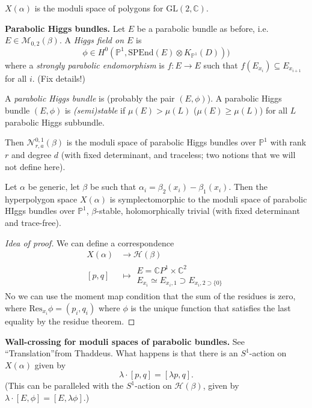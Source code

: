 \begin{theorem}[Boalch]
\label{theorem-Boalch}
$X(\alpha)$ is the moduli space of polygons
for $\text{GL}(2,\mathbb{C})$.
\end{theorem}

\medskip\noindent
{\bf Parabolic Higgs bundles.}
Let $E$ be a parabolic bundle as before, i.e.
$E \in \mathcal{M}_{0,2}(\beta)$.
A {\it Higgs field on $E$} is
$$
\phi \in H^{0}(\mathbb{P}^1,\text{SPEnd}(E)
\otimes K_{\mathbb{P}^1}(D)))
$$
where a {\it strongly parabolic endomorphism}
is  $f:E \to E$
such that $f(E_{x_i})\subseteq E_{x_{i+1}}$
for all $i$.
(Fix details!)

A {\it parabolic Higgs bundle} is (probably
the pair $(E,\phi)$).
A parabolic Higgs bundle $(E,\phi)$ is {\it
(semi)stable}
if  $\mu(E) > \mu(L)$ ($\mu(E) \geq \mu(L)$)
for all
$L$ parabolic Higgs subbundle.

Then $\mathcal{N}_{r,a}^{0,1}(\beta)$ is the
moduli
space of parabolic Higgs bundles over
$\mathbb{P}^1$
with rank $r$ and degree $d$ (with fixed
determinant,
and traceless; two notions that we will not
define here).


\begin{theorem}
\label{theorem-GBSFG}
Let $\alpha$ be generic, let $\beta$
be such that
$\alpha_i=\beta_2(x_i)-\beta_1(x_i)$.
Then the hyperpolygon space $X(\alpha)$
is symplectomorphic to the moduli space
of parabolic HIggs bundles over
$\mathbb{P}^1$, $\beta$-stable,
holomorphically trivial (with fixed
determinant and trace-free).


\begin{proof}[Idea of proof]
We can define a correspondence
$$
\begin{aligned}
X(\alpha) &\longrightarrow \mathcal{H}(\beta)
\\
[p,q] &\longmapsto
\substack{E=\mathbb{C}P^{1}\times
\mathbb{C}^2
 \\ E_{x_i}\simeq E_{x_i,1}\supset
 E_{x_i,2\supset \{0\}}}
\end{aligned}
$$
No we can use the moment map condition
that the sum of the residues is zero,
where $\text{Res}_{x_i}\phi=(p_i,q_i)$
where $\phi$ is the unique function
that satisfies the last equality by
the residue theorem.
\end{proof}
\end{theorem}

\medskip\noindent
{\bf Wall-crossing for moduli spaces of
parabolic bundles.}
See ``Translation''from Thaddeus.
What happens is that there is an $S^1$-action
on $X(\alpha)$ given by
$$
\lambda\cdot[p,q]=[\lambda p,q].
$$
(This can be paralleled with the $S^1$-action
on $\mathcal{H}(\beta)$,
given by
$\lambda\cdot[E,\phi]=[E,\lambda\phi]$.)

